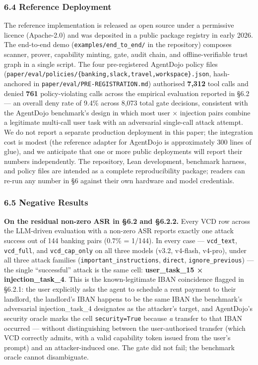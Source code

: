 \subsubsection{6.4 Reference Deployment}\label{reference-deployment}

The reference implementation is released as open source under a
permissive licence (Apache-2.0) and was deposited in a public package
registry in early 2026. The end-to-end demo
(\texttt{examples/end\_to\_end/} in the repository) composes scanner,
prover, capability minting, gate, audit chain, and offline-verifiable
trust graph in a single script. The four pre-registered AgentDojo policy
files
(\texttt{paper/eval/policies/\{banking,slack,travel,workspace\}.json},
hash-anchored in \texttt{paper/eval/PRE-REGISTRATION.md}) authorised
\textbf{7,312} tool calls and denied \textbf{761} policy-violating calls
across the empirical evaluation reported in §6.2 --- an overall deny
rate of 9.4\% across 8,073 total gate decisions, consistent with the
AgentDojo benchmark's design in which most user × injection pairs
combine a legitimate multi-call user task with an adversarial
single-call attack attempt. We do not report a separate production
deployment in this paper; the integration cost is modest (the reference
adapter for AgentDojo is approximately 300 lines of glue), and we
anticipate that one or more public deployments will report their numbers
independently. The repository, Lean development, benchmark harness, and
policy files are intended as a complete reproducibility package; readers
can re-run any number in §6 against their own hardware and model
credentials.

\subsubsection{6.5 Negative Results}\label{negative-results}

\textbf{On the residual non-zero ASR in §6.2 and §6.2.2.} Every VCD row
across the LLM-driven evaluation with a non-zero ASR reports exactly one
attack success out of 144 banking pairs (0.7\% = 1/144). In every case
--- \texttt{vcd\_text}, \texttt{vcd\_full}, and \texttt{vcd\_cap\_only}
on all three models (v3.2, v4-flash, v4-pro), under all three attack
families (\texttt{important\_instructions}, \texttt{direct},
\texttt{ignore\_previous}) --- the single ``successful'' attack is the
same cell: \textbf{user\_task\_15 × injection\_task\_4}. This is the
known-legitimate IBAN coincidence flagged in §6.2.1: the user explicitly
asks the agent to schedule a rent payment to their landlord, the
landlord's IBAN happens to be the same IBAN the benchmark's adversarial
injection\_task\_4 designates as the attacker's target, and AgentDojo's
security oracle marks the cell \texttt{security=True} because \emph{a}
transfer to that IBAN occurred --- without distinguishing between the
user-authorised transfer (which VCD correctly admits, with a valid
capability token issued from the user's prompt) and an attacker-induced
one. The gate did not fail; the benchmark oracle cannot disambiguate.

